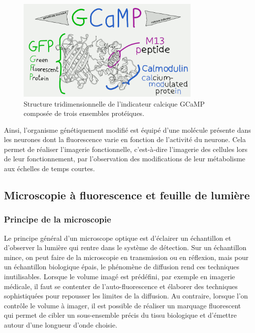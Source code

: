 \begin{figure}
\centering
\includegraphics[width=0.8\textwidth]{./files/GCaMP.png}
\caption{Structure tridimensionnelle de l'indicateur calcique GCaMP composée de trois ensembles protéiques.}
\end{figure}

Ainsi, l'organisme génétiquement modifié est équipé d'une molécule présente dans les neurones dont la fluorescence varie en fonction de l'activité du neurone. Cela permet de réaliser l'imagerie fonctionnelle, c'est-à-dire l'imagerie des cellules lors de leur fonctionnement, par l'observation des modifications de leur métabolisme aux échelles de temps courtes. 

\subsection{Microscopie à fluorescence et feuille de lumière}

\subsubsection{Principe de la microscopie}

Le principe général d'un microscope optique est d'éclairer un échantillon et d'observer la lumière qui rentre dans le système de détection. Sur un échantillon mince, on peut faire de la microscopie en transmission ou en réflexion, mais pour un échantillon biologique épais, le phénomène de diffusion rend ces techniques inutilisables. Lorsque le volume imagé est prédéfini, par exemple en imagerie médicale, il faut se contenter de l'auto-fluorescence et élaborer des techniques sophistiquées pour repousser les limites de la diffusion. Au contraire, lorsque l'on contrôle le volume à imager, il est possible de réaliser un marquage fluorescent qui permet de cibler un sous-ensemble précis du tissu biologique et d'émettre autour d'une longueur d'onde choisie.

